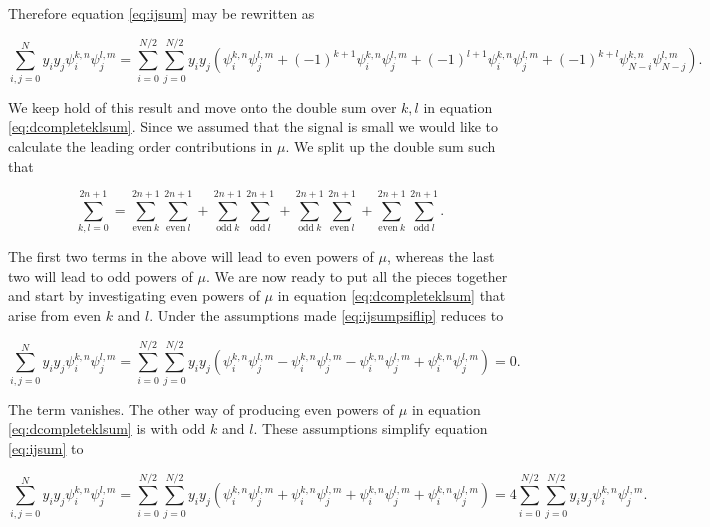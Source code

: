 \documentclass[apj]{emulateapj}
\begin{document}
Therefore equation \ref{eq:ijsum} may be rewritten as

\begin{equation} \label{eq:ijsumpsiflip}
\sum_{i,j = 0}^N y_i y_j \psi_i^{k, n} \psi_j^{l, m} = \sum_{i = 0}^{N/2}\sum_{j = 0}^{N/2} y_i y_j \left( \psi_i^{k, n} \psi_j^{l, m} + (-1)^{k+1} \psi_{i}^{k, n} \psi_j^{l, m} + (-1)^{l+1} \psi_i^{k, n} \psi_{j}^{l, m} + (-1)^{k+l} \psi_{N-i}^{k, n} \psi_{N-j}^{l, m} \right).
\end{equation}

We keep hold of this result and move onto the double sum over $k,l$ in equation \ref{eq:dcompleteklsum}. Since we assumed that the signal is small we would like to calculate the leading order contributions in $\mu$. We split up the double sum such that

\begin{equation} \label{eq:ksums}
\sum_{k, l = 0}^{2n+1} = \sum_{\mathrm{even} \> k}^{2n+1} \sum_{\mathrm{even} \> l}^{2n+1}  + \sum_{\mathrm{odd} \> k}^{2n+1} \sum_{\mathrm{odd} \> l}^{2n+1} + \sum_{\mathrm{odd} \> k}^{2n+1} \sum_{\mathrm{even} \> l}^{2n+1}  + \sum_{\mathrm{even} \> k}^{2n+1} \sum_{\mathrm{odd} \> l}^{2n+1}.
\end{equation}

The first two terms in the above will lead to even powers of $\mu$, whereas the last two will lead to odd powers of $\mu$. We are now ready to put all the pieces together and start by investigating even powers of $\mu$ in equation \ref{eq:dcompleteklsum} that arise from even $k$ and $l$. Under the assumptions made \ref{eq:ijsumpsiflip} reduces to

\begin{equation}
\sum_{i,j = 0}^N y_i y_j \psi_i^{k, n} \psi_j^{l, m} = \sum_{i = 0}^{N/2}\sum_{j = 0}^{N/2} y_i y_j  \left( \psi_i^{k, n} \psi_j^{l, m} - \psi_{i}^{k, n} \psi_j^{l, m} - \psi_i^{k, n} \psi_{j}^{l, m} + \psi_{i}^{k, n} \psi_{j}^{l, m} \right) = 0.
\end{equation}

The term vanishes. The other way of producing even powers of $\mu$ in equation \ref{eq:dcompleteklsum} is with odd $k$ and $l$. These assumptions simplify equation \ref{eq:ijsum} to

\begin{equation}
\sum_{i,j = 0}^N y_i y_j \psi_i^{k, n} \psi_j^{l, m} = \sum_{i = 0}^{N/2}\sum_{j = 0}^{N/2} y_i y_j \left( \psi_i^{k, n} \psi_j^{l, m} + \psi_{i}^{k, n} \psi_j^{l, m} + \psi_i^{k, n} \psi_{j}^{l, m} + \psi_{i}^{k, n} \psi_{j}^{l, m} \right) = 4 \sum_{i = 0}^{N/2}\sum_{j = 0}^{N/2} y_i y_j \psi_i^{k, n} \psi_j^{l, m}.
\end{equation}
\end{document}
